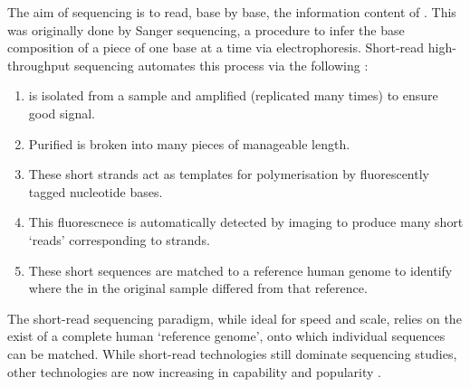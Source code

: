 \documentclass[thesis.tex]{subfiles}
\begin{document}
The aim of sequencing is to read, base by base, the information content of . This was originally done by Sanger sequencing, a procedure to infer the base composition of a piece of  one base at a time \citep{sanger_dna_1977} via electrophoresis. Short-read high-throughput sequencing automates this process via the following  \citep{bentley_accurate_2008}:

\begin{enumerate}
    \item {} is isolated from a sample and amplified (replicated many times) to ensure good signal.
    \item Purified  is broken into many pieces of manageable length.
    \item These short strands act as templates for polymerisation by fluorescently tagged nucleotide bases.
    \item This fluorescnece is automatically detected by imaging to produce many short `reads' corresponding to strands.
    \item These short sequences are matched to a reference human genome to identify where the  in the original sample differed from that reference.
\end{enumerate}

The short-read sequencing paradigm, while ideal for speed and scale, relies on the exist of a complete human `reference genome', onto which individual sequences can be matched. While short-read technologies still dominate sequencing studies, other technologies are now increasing in capability and popularity \citep{jain_oxford_2016}.
\end{document}
